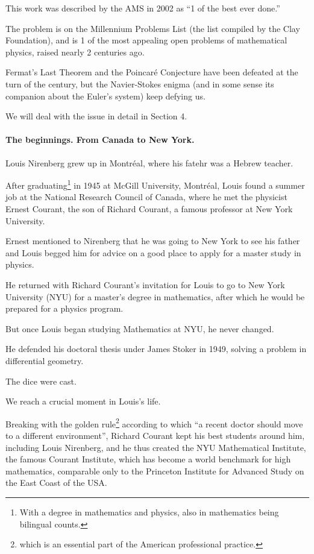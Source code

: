 \documentclass{article}
\begin{document}
This work was described by the AMS in 2002 as ``1 of the best ever done.''

The problem is on the Millennium Problems List (the list compiled by the Clay Foundation), and is 1 of the most appealing open problems of mathematical physics, raised nearly 2 centuries ago.

Fermat's Last Theorem and the Poincar\'e Conjecture have been defeated at the turn of the century, but the Navier-Stokes enigma (and in some sense its companion about the Euler's system) keep defying us.

We will deal with the issue in detail in Section 4.

\paragraph{The beginnings. From Canada to New York.} Louis Nirenberg grew up in Montr\'eal, where his fatehr was a Hebrew teacher.

After graduating\footnote{With a degree in mathematics and physics, also in mathematics being bilingual counts.} in 1945 at McGill University, Montréal, Louis found a summer job at the National Research Council of Canada, where he met the physicist Ernest Courant, the son of Richard Courant, a famous professor at New York University.

Ernest mentioned to Nirenberg that he was going to New York to see his father and Louis begged him for advice on a good place to apply for a master study in physics.

He returned with Richard Courant's invitation for Louis to go to New York University (NYU) for a master's degree in mathematics, after which he would be prepared for a physics program.

%
But once Louis began studying Mathematics at NYU, he never changed.

He defended his doctoral thesis under James Stoker in 1949, solving a problem in differential geometry.

The dice were cast.

We reach a crucial moment in Louis's life.

Breaking with the golden rule\footnote{which is an essential part of the American professional practice.} according to which ``a recent doctor should move to a different environment'', Richard Courant kept his best students around him, including Louis Nirenberg, and he thus created the NYU Mathematical Institute, the famous Courant Institute, which has become a world benchmark for high mathematics, comparable only to the Princeton Institute for Advanced Study on the East Coast of the USA.
\end{document}
